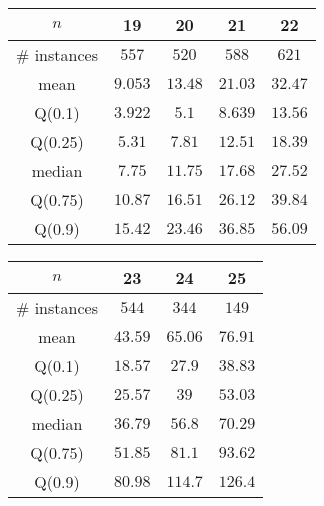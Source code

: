 \begin{tabular}{c|cccc} 
\hline 
$n$ & 19 & 20 & 21 & 22 \tabularnewline 
\hline 
\hline 
\# instances & $557$ & $520$ & $588$ & $621$ \tabularnewline 
mean & $9.053$ & $13.48$ & $21.03$ & $32.47$ \tabularnewline 
Q(0.1) & $3.922$ & $5.1$ & $8.639$ & $13.56$ \tabularnewline 
Q(0.25) & $5.31$ & $7.81$ & $12.51$ & $18.39$ \tabularnewline 
median & $7.75$ & $11.75$ & $17.68$ & $27.52$ \tabularnewline 
Q(0.75) & $10.87$ & $16.51$ & $26.12$ & $39.84$ \tabularnewline 
Q(0.9) & $15.42$ & $23.46$ & $36.85$ & $56.09$ \tabularnewline 
\hline 
\end{tabular} 
\medskip{} 

\begin{tabular}{c|ccc} 
\hline 
$n$ & 23 & 24 & 25 \tabularnewline 
\hline 
\hline 
\# instances & $544$ & $344$ & $149$ \tabularnewline 
mean & $43.59$ & $65.06$ & $76.91$ \tabularnewline 
Q(0.1) & $18.57$ & $27.9$ & $38.83$ \tabularnewline 
Q(0.25) & $25.57$ & $39$ & $53.03$ \tabularnewline 
median & $36.79$ & $56.8$ & $70.29$ \tabularnewline 
Q(0.75) & $51.85$ & $81.1$ & $93.62$ \tabularnewline 
Q(0.9) & $80.98$ & $114.7$ & $126.4$ \tabularnewline 
\hline 
\end{tabular} 
\medskip{} 

